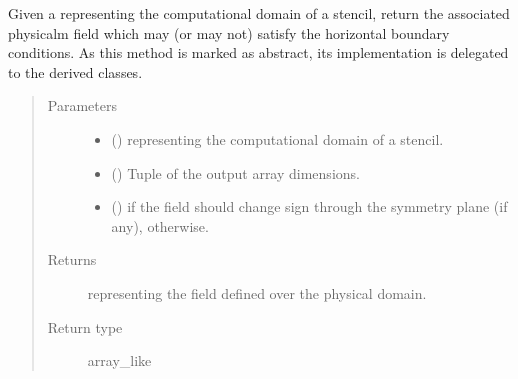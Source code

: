 \documentclass[letterpaper,10pt,english]{sphinxmanual}
\begin{document}
\begin{fulllineitems}
\begin{fulllineitems}
\label{\detokenize{api:dycore.horizontal_boundary.HorizontalBoundary.from_computational_to_physical_domain}}
Given a  representing the computational domain of a stencil, return the
associated physicalm field which may (or may not) satisfy the horizontal boundary conditions.
As this method is marked as abstract, its implementation is delegated to the derived classes.
\begin{quote}\begin{description}
\item[{Parameters}] \leavevmode\begin{itemize}
\item {} 
 () \textendash{}  representing the computational domain of a stencil.

\item {} 
 () \textendash{} Tuple of the output array dimensions.

\item {} 
 () \textendash{}  if the field should change sign through the symmetry plane (if any),  otherwise.

\end{itemize}

\item[{Returns}] \leavevmode
{} representing the field defined over the physical domain.

\item[{Return type}] \leavevmode
array\_like

\end{description}\end{quote}

\end{fulllineitems}


\end{fulllineitems}
\end{document}
